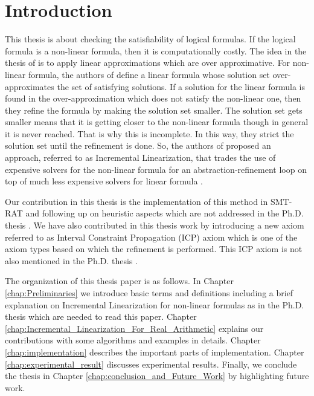 \chapter{Introduction}
\label{chap:Introduction}
This thesis is about checking the satisfiability of logical formulas.
If the logical formula is a non-linear formula, then it is computationally costly.
The idea in the thesis of \cite{Cimatti:2018:ILS:3274693.3230639} is to apply linear approximations which are over approximative.
For non-linear formula, the authors of \cite{Cimatti:2018:ILS:3274693.3230639} define a linear formula whose solution set over-approximates the set of satisfying solutions.
If a solution for the linear formula is found in the over-approximation which does not satisfy the non-linear one, then they refine the formula by making the solution set smaller.
The solution set gets smaller means that it is getting closer to the non-linear formula though in general it is never reached.
That is why this is incomplete.
In this way, they strict the solution set until the refinement is done.
So, the authors of \cite{Cimatti:2018:ILS:3274693.3230639} proposed an approach, referred to as Incremental Linearization, that trades the use of expensive solvers for the non-linear formula for an abstraction-refinement loop on top of much less expensive solvers for linear formula \cite{Cimatti:2018:ILS:3274693.3230639}.\newline

\noindent Our contribution in this thesis is the implementation of this method in SMT-RAT and following up on heuristic aspects which are not addressed in the Ph.D. thesis \cite{irfan2018incremental}.
We have also contributed in this thesis work by introducing a new axiom referred to as Interval Constraint Propagation (ICP) axiom which is one of the axiom types based on which the refinement is performed.
This ICP axiom is not also mentioned in the Ph.D. thesis \cite{irfan2018incremental}.\newline

\noindent The organization of this thesis paper is as follows.
In Chapter \ref{chap:Preliminaries} we introduce basic terms and definitions including a brief explanation on Incremental Linearization for non-linear formulas as in the Ph.D. thesis \cite{irfan2018incremental} which are needed to read this paper.
Chapter \ref{chap:Incremental_Linearization_For_Real_Arithmetic} explains our contributions with some algorithms and examples in details.
Chapter \ref{chap:implementation} describes the important parts of implementation.
Chapter \ref{chap:experimental_result} discusses experimental results.
Finally, we conclude the thesis in Chapter \ref{chap:conclusion_and_Future_Work} by highlighting future work.

